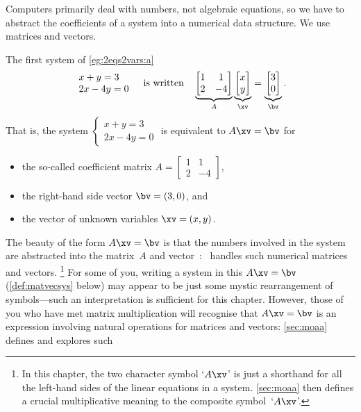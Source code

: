 Computers primarily deal with numbers, not algebraic equations, so we have to abstract the coefficients of a system into a numerical data structure.
We use matrices and vectors.
\begin{example} 
The first system of \cref{eg:2eqs2vars:a}
\begin{equation*}
\begin{array}{l} x+y=3\\2x-4y=0 \end{array}
\quad\text{is written}\quad
\underbrace{\begin{bmatrix} 1&1\\2&-4 \end{bmatrix}}_A
\underbrace{\begin{bmatrix} x\\y \end{bmatrix}}_\xv
=\underbrace{\begin{bmatrix} 3\\0 \end{bmatrix}}_\bv .
\end{equation*}
That is, the system \(\begin{cases} x+y=3\\2x-4y=0 \end{cases}\)
is equivalent to \(A\xv=\bv\) for
\begin{itemize}
\item the so-called coefficient matrix \(A=\begin{bmatrix} 1&1\\2&-4 \end{bmatrix}\), 
\item the right-hand side vector \(\bv=(3,0)\), and 
\item the vector of unknown variables \(\xv=(x,y)\).
\end{itemize}

\end{example}


The beauty of the form \(A\xv=\bv\) is that the numbers involved in the system are abstracted into the matrix~\(A\) and vector~\bv: \script\ handles such numerical matrices and vectors.
\footnote{In this chapter, the two character symbol `\(A\xv\)' is just a shorthand for all the left-hand sides of the linear equations in a system.
\cref{sec:moaa} then defines a crucial multiplicative meaning to the composite symbol~`\(A\xv\)'.}
For some of you, writing a system in this  \(A\xv=\bv\) (\cref{def:matvecsys} below) may appear to be just some mystic rearrangement of symbols---such an interpretation is sufficient for this chapter.
However, those of you who have met matrix multiplication will recognise that \(A\xv=\bv\) is an expression involving natural operations for matrices and vectors: \cref{sec:moaa} defines and explores such 

